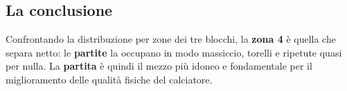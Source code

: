 \subsection{La conclusione}

Confrontando la distribuzione per zone dei tre blocchi, la \textbf{zona 4} è quella che separa
netto: le \textbf{partite} la occupano in modo massiccio, torelli e ripetute quasi per nulla. La
\textbf{partita} è quindi il mezzo più idoneo e fondamentale per il miglioramento delle qualità
fisiche del calciatore.
